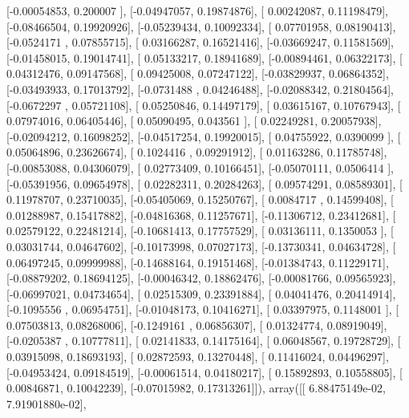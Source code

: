 \documentclass{article}
\begin{document}
       [-0.00054853,  0.200007  ],
       [-0.04947057,  0.19874876],
       [ 0.00242087,  0.11198479],
       [-0.08466504,  0.19920926],
       [-0.05239434,  0.10092334],
       [ 0.07701958,  0.08190413],
       [-0.0524171 ,  0.07855715],
       [ 0.03166287,  0.16521416],
       [-0.03669247,  0.11581569],
       [-0.01458015,  0.19014741],
       [ 0.05133217,  0.18941689],
       [-0.00894461,  0.06322173],
       [ 0.04312476,  0.09147568],
       [ 0.09425008,  0.07247122],
       [-0.03829937,  0.06864352],
       [-0.03493933,  0.17013792],
       [-0.0731488 ,  0.04246488],
       [-0.02088342,  0.21804564],
       [-0.0672297 ,  0.05721108],
       [ 0.05250846,  0.14497179],
       [ 0.03615167,  0.10767943],
       [ 0.07974016,  0.06405446],
       [ 0.05090495,  0.043561  ],
       [ 0.02249281,  0.20057938],
       [-0.02094212,  0.16098252],
       [-0.04517254,  0.19920015],
       [ 0.04755922,  0.0390099 ],
       [ 0.05064896,  0.23626674],
       [ 0.1024416 ,  0.09291912],
       [ 0.01163286,  0.11785748],
       [-0.00853088,  0.04306079],
       [ 0.02773409,  0.10166451],
       [-0.05070111,  0.0506414 ],
       [-0.05391956,  0.09654978],
       [ 0.02282311,  0.20284263],
       [ 0.09574291,  0.08589301],
       [ 0.11978707,  0.23710035],
       [-0.05405069,  0.15250767],
       [ 0.0084717 ,  0.14599408],
       [ 0.01288987,  0.15417882],
       [-0.04816368,  0.11257671],
       [-0.11306712,  0.23412681],
       [ 0.02579122,  0.22481214],
       [-0.10681413,  0.17757529],
       [ 0.03136111,  0.1350053 ],
       [ 0.03031744,  0.04647602],
       [-0.10173998,  0.07027173],
       [-0.13730341,  0.04634728],
       [ 0.06497245,  0.09999988],
       [-0.14688164,  0.19151468],
       [-0.01384743,  0.11229171],
       [-0.08879202,  0.18694125],
       [-0.00046342,  0.18862476],
       [-0.00081766,  0.09565923],
       [-0.06997021,  0.04734654],
       [ 0.02515309,  0.23391884],
       [ 0.04041476,  0.20414914],
       [-0.1095556 ,  0.06954751],
       [-0.01048173,  0.10416271],
       [ 0.03397975,  0.1148001 ],
       [ 0.07503813,  0.08268006],
       [-0.1249161 ,  0.06856307],
       [ 0.01324774,  0.08919049],
       [-0.0205387 ,  0.10777811],
       [ 0.02141833,  0.14175164],
       [ 0.06048567,  0.19728729],
       [ 0.03915098,  0.18693193],
       [ 0.02872593,  0.13270448],
       [ 0.11416024,  0.04496297],
       [-0.04953424,  0.09184519],
       [-0.00061514,  0.04180217],
       [ 0.15892893,  0.10558805],
       [ 0.00846871,  0.10042239],
       [-0.07015982,  0.17313261]]), array([[  6.88475149e-02,   7.91901880e-02],
\end{document}
